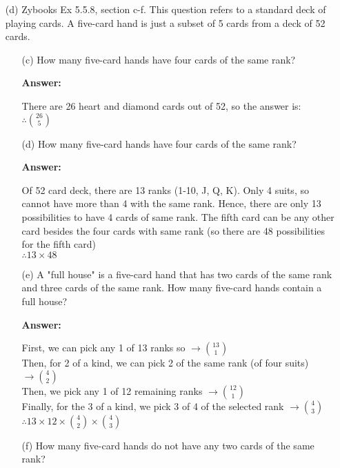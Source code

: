 \documentclass[14pt]{extreport}
\newcommand{\answer}[0]{\medskip \textbf{Answer:} \medskip}
\begin{document}
\begin{enumerate}[label=(\alph*)]
\item[(d)] Zybooks Ex 5.5.8, section c-f. This question refers to a standard deck of playing cards. A five-card hand is just a subset of 5 cards from a deck of 52 cards. 
        
\begin{enumerate}
    
    \item[(c)] How many five-card hands have four cards of the same rank? 
    
        \answer
        
        There are 26 heart and diamond cards out of 52, so the answer is: \\
        $\therefore \binom{26}{5}$\\
    
    \item[(d)] How many five-card hands have four cards of the same rank? 
    
        \answer
        
        Of 52 card deck, there are 13 ranks (1-10, J, Q, K). Only 4 suits, so cannot have more than 4 with the same rank. Hence, there are only 13 possibilities to have 4 cards of same rank. The fifth card can be any other card besides the four cards with same rank (so there are 48 possibilities for the fifth card) \\
        $\therefore 13 \times 48$\\
    
    \item[(e)] A "full house" is a five-card hand that has two cards of the same rank and three cards of the same rank. How many five-card hands contain a full house? 
    
        \answer
        
        First, we can pick any 1 of 13 ranks so $\rightarrow \binom{13}{1}$ \\
        Then, for 2 of a kind, we can pick 2 of the same rank (of four suits) $\rightarrow \binom{4}{2}$ \\
        Then, we pick any 1 of 12 remaining ranks $\rightarrow \binom{12}{1}$ \\
        Finally, for the 3 of a kind, we pick 3 of 4 of the selected rank $\rightarrow \binom{4}{3}$\\
        $\therefore 13 \times 12 \times \binom{4}{2} \times  \binom{4}{3}$\\
    
    \item[(f)] How many five-card hands do not have any two cards of the same rank? 
    

\end{enumerate}
\end{enumerate}
\end{document}
